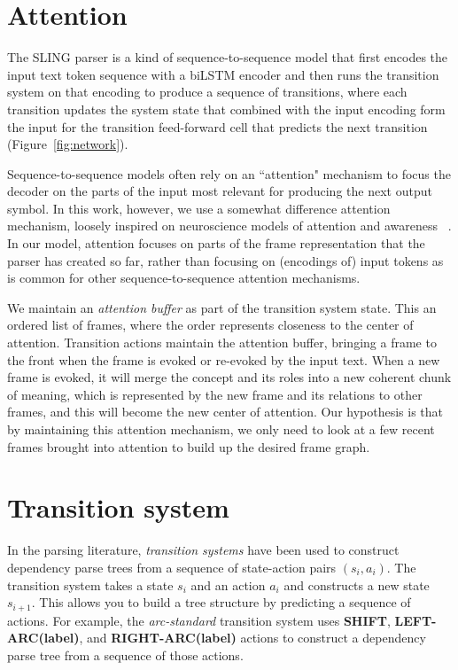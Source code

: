 \documentclass[11pt,a4paper]{article}
\begin{document}
\section{Attention}
\label{sec:att}

The SLING parser is a kind of sequence-to-sequence model that first encodes the
input text token sequence with a biLSTM encoder and then runs the transition
system on that encoding to produce a sequence of transitions, where each transition
updates the system state that combined with the input encoding form the input for
the transition feed-forward cell that predicts the next transition (Figure~\ref{fig:network}).

Sequence-to-sequence models often rely on an ``attention" mechanism to focus
the decoder on the parts of the input most relevant for producing the next output
symbol. In this work, however, we use a somewhat difference attention mechanism,
loosely inspired on neuroscience models of attention and awareness
~\cite{nelson2017,graziano2013}. In our model, attention focuses on parts of the frame
representation that the parser has created so far, rather than focusing on (encodings of)
input tokens as is common for other sequence-to-sequence attention mechanisms.

We maintain an \emph{attention buffer} as part of the transition system state.
This an ordered list of frames, where the order represents closeness to the center
of attention. Transition actions maintain the attention buffer, bringing a frame
to the front when the frame
is evoked or re-evoked by the input text. When a new frame is evoked, it will
merge the concept and its roles into a new coherent chunk of meaning, which is
represented by the new frame and its relations to other frames, and this will
become the new center of attention. Our hypothesis is that by maintaining this
attention mechanism, we only need to look at a few recent frames brought into
attention to build up the desired frame graph.

\section{Transition system}
\label{sec:ts}

In the parsing literature, \emph{transition systems} have been
used to construct dependency parse trees from a sequence of state-action pairs
$(s_i,a_i)$. The transition system takes a state $s_i$ and an action $a_i$ and
constructs a new state $s_{i+1}$. This allows you to build a tree structure by
predicting a sequence of actions. For example, the \emph{arc-standard}
transition system \cite{nivre2006} uses {\bf SHIFT}, {\bf LEFT-ARC(label)}, and
{\bf RIGHT-ARC(label)} actions to construct a dependency parse tree from a
sequence of those actions.
\end{document}
